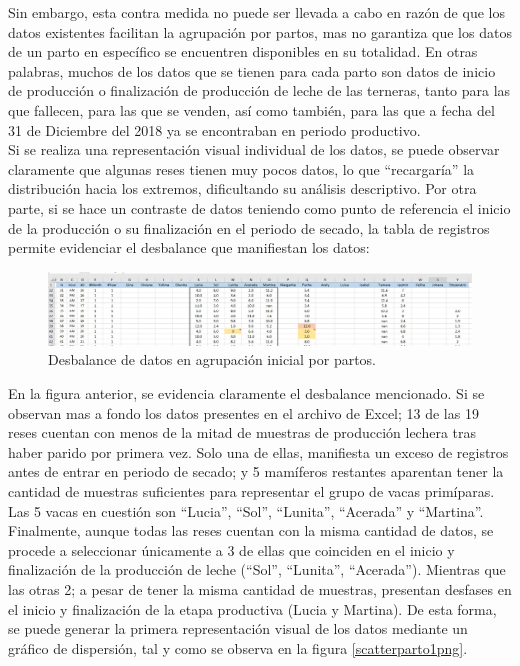 Sin embargo, esta contra medida no puede ser llevada a cabo en razón de que los datos existentes facilitan la agrupación por partos, mas no garantiza que los datos de un parto en específico se encuentren disponibles en su totalidad. En otras palabras, muchos de los datos que se tienen para cada parto son datos de inicio de producción o finalización de producción de leche de las terneras, tanto para las que fallecen, para las que se venden, así como también, para las que a fecha del 31 de Diciembre del 2018 ya se encontraban en periodo productivo.\\

Si se realiza una representación visual individual de los datos, se puede observar claramente que algunas reses tienen muy pocos datos, lo que ``recargaría'' la distribución hacia los extremos, dificultando su análisis descriptivo. Por otra parte, si se hace un contraste de datos teniendo como punto de referencia el inicio de la producción o su finalización en el periodo de secado, la tabla de registros permite evidenciar el desbalance que manifiestan los datos:

\begin{figure}[H]
	 \begin{center}
	 \includegraphics[scale=0.34]{img/partosincompletos.jpg}
	 \end{center}
	 \caption{Desbalance de datos en agrupación inicial por partos. \label{partosincompletospng}}
\end{figure}

En la figura anterior, se evidencia claramente el desbalance mencionado. Si se observan mas a fondo los datos presentes en el archivo de Excel; 13 de las 19 reses cuentan con menos de la mitad de muestras de producción lechera tras haber parido por primera vez. Solo una de ellas, manifiesta un exceso de registros antes de entrar en periodo de secado; y 5 mamíferos restantes aparentan tener la cantidad de muestras suficientes para representar el grupo de vacas primíparas. Las 5 vacas en cuestión son ``Lucia'', ``Sol'', ``Lunita'', ``Acerada'' y ``Martina''.\\

Finalmente, aunque todas las reses cuentan con la misma cantidad de datos, se procede a seleccionar únicamente a 3 de ellas que coinciden en el inicio y finalización de la producción de leche (``Sol'', ``Lunita'', ``Acerada''). Mientras que las otras 2; a pesar de tener la misma cantidad de muestras, presentan desfases en el inicio y finalización de la etapa productiva (Lucia y Martina). De esta forma, se puede generar la primera representación visual de los datos mediante un gráfico de dispersión, tal y como se observa en la  figura \ref{scatterparto1png}.

